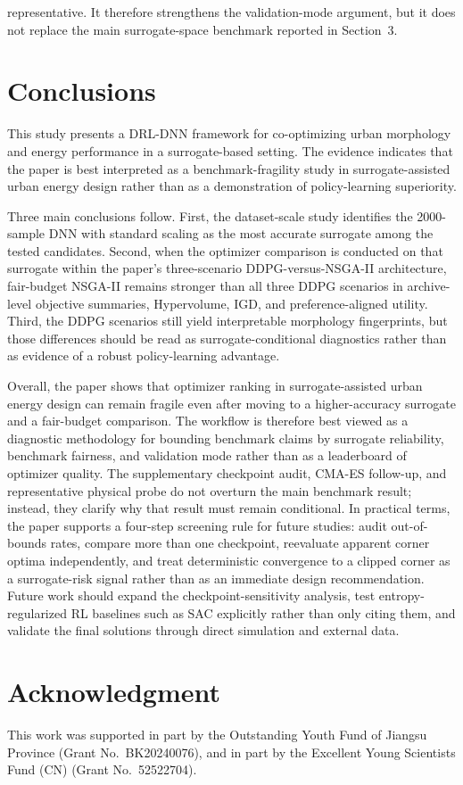\documentclass[final,3p,times]{elsarticle}
\begin{document}
representative. It therefore strengthens the validation-mode argument, but it does not replace the main surrogate-space benchmark reported in Section~3.

\section{Conclusions}

This study presents a DRL-DNN framework for co-optimizing urban morphology and energy performance in a surrogate-based setting. The evidence indicates that the paper is best interpreted as a benchmark-fragility study in surrogate-assisted urban energy design rather than as a demonstration of policy-learning superiority.

Three main conclusions follow. First, the dataset-scale study identifies the 2000-sample DNN with standard scaling as the most accurate surrogate among the tested candidates. Second, when the optimizer comparison is conducted on that surrogate within the paper's three-scenario DDPG-versus-NSGA-II architecture, fair-budget NSGA-II remains stronger than all three DDPG scenarios in archive-level objective summaries, Hypervolume, IGD, and preference-aligned utility. Third, the DDPG scenarios still yield interpretable morphology fingerprints, but those differences should be read as surrogate-conditional diagnostics rather than as evidence of a robust policy-learning advantage.

Overall, the paper shows that optimizer ranking in surrogate-assisted urban energy design can remain fragile even after moving to a higher-accuracy surrogate and a fair-budget comparison. The workflow is therefore best viewed as a diagnostic methodology for bounding benchmark claims by surrogate reliability, benchmark fairness, and validation mode rather than as a leaderboard of optimizer quality. The supplementary checkpoint audit, CMA-ES follow-up, and representative physical probe do not overturn the main benchmark result; instead, they clarify why that result must remain conditional. In practical terms, the paper supports a four-step screening rule for future studies: audit out-of-bounds rates, compare more than one checkpoint, reevaluate apparent corner optima independently, and treat deterministic convergence to a clipped corner as a surrogate-risk signal rather than as an immediate design recommendation. Future work should expand the checkpoint-sensitivity analysis, test entropy-regularized RL baselines such as SAC explicitly rather than only citing them, and validate the final solutions through direct simulation and external data.



\section*{Acknowledgment}

This work was supported in part by the Outstanding Youth Fund of Jiangsu Province (Grant No.~BK20240076), and in part by the Excellent Young Scientists Fund (CN) (Grant No.~52522704).


\end{document}
